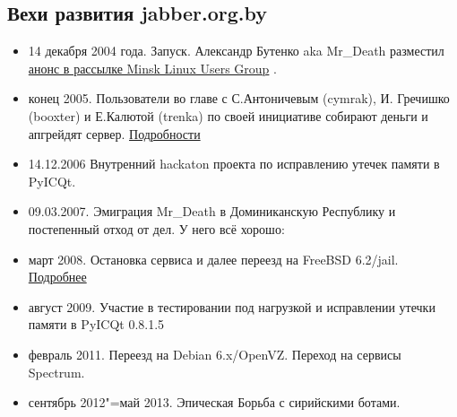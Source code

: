 \documentclass[10pt, a5paper]{article}
\begin{document}
\subsection{Вехи развития jabber.org.by}

\begin{itemize}
  \item 14 декабря 2004 года. Запуск. Александр Бутенко aka Mr\_Death разместил \href{http://article.gmane.org/gmane.user"=groups.linux.minsk.general/173}{анонс в рассылке Minsk Linux Users Group} .
\end{itemize}

\begin{itemize}
  \item конец 2005. Пользователи во главе с С.Антоничевым (cymrak), И. Гречишко (booxter)  и Е.Калютой (trenka) по своей инициативе собирают деньги и апгрейдят сервер. \href{https://forum.linux.by/viewtopic.php?f=2&t=8455}{Подробности}
\end{itemize}

\begin{itemize}
  \item 14.12.2006 Внутренний hackaton проекта по исправлению утечек памяти в PyICQt.
\end{itemize}

\begin{itemize}
  \item 09.03.2007. Эмиграция Mr\_Death в Доминиканскую Республику и постепенный отход от дел. 
У него всё хорошо:


\end{itemize}

\begin{itemize}
  \item март 2008. Остановка сервиса и далее переезд на FreeBSD 6.2/jail. \href{https://forum.linux.by/viewtopic.php?t=9555}{Подробнее}
\end{itemize}

\begin{itemize}
  \item август 2009. Участие в тестировании под нагрузкой и исправлении утечки памяти в PyICQt 0.8.1.5
\end{itemize}

\begin{itemize}
  \item февраль 2011. Переезд на Debian 6.x/OpenVZ. Переход на сервисы Spectrum.
\end{itemize}

\begin{itemize}
  \item сентябрь 2012"=май 2013. Эпическая Борьба с сирийскими ботами.
\end{itemize}
\end{document}
